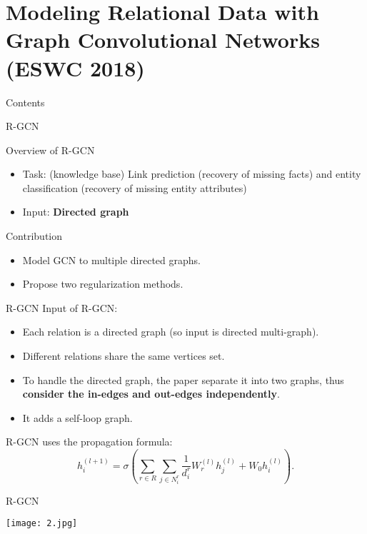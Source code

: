 \documentclass{beamer}
\begin{document}
	\section[R-GCN ESWC 2018]{Modeling Relational Data with Graph Convolutional Networks (ESWC 2018)}
		\begin{frame}{Contents}
			\small
		\end{frame}
		\begin{frame}{R-GCN}
			\begin{block}{Overview of R-GCN}
				\begin{itemize}
					\item Task: (knowledge base) Link prediction (recovery of missing facts) and entity classification (recovery of missing entity attributes)
					\item Input: \textbf{Directed graph}
				\end{itemize}
			\end{block}
			\begin{block}{Contribution}
				\begin{itemize}
					\item Model GCN to multiple directed graphs.
					\item Propose two regularization methods.
				\end{itemize}
			\end{block}
		\end{frame}
		\begin{frame}{R-GCN}
			Input of R-GCN:
			\begin{itemize}
				\item Each relation is a directed graph (so input is directed multi-graph).
				\item Different relations share the same vertices set.
				\item To handle the directed graph, the paper separate it into two graphs, thus \textbf{consider the in-edges and out-edges independently}.
				\item It adds a self-loop graph.
			\end{itemize}
			R-GCN uses the propagation formula:
			\[
			h_i^{(l+1)} = \sigma(\sum_{r \in R} \sum_{j \in N_i^r} \frac{1}{d_i^r} W_r^{(l)}h_j^{(l)}+ W_0h_i^{(l)}).
			\]
		\end{frame}
		\begin{frame}{R-GCN}
			\begin{center}
				\texttt{[image: 2.jpg]}
			\end{center}
		\end{frame}
\end{document}
